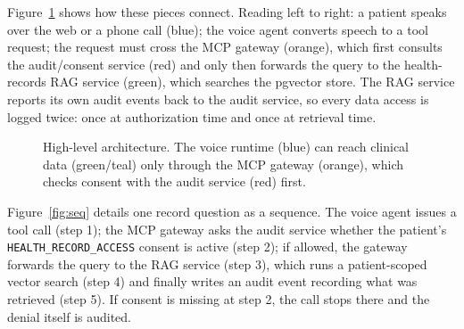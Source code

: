 \documentclass[conference]{IEEEtran}
\begin{document}
Figure~\ref{fig:arch} shows how these pieces connect.
Reading left to right: a patient speaks over the web or a phone call (blue); the voice agent converts speech to a tool request; the request must cross the MCP gateway (orange), which first consults the audit/consent service (red) and only then forwards the query to the health-records RAG service (green), which searches the pgvector store.
The RAG service reports its own audit events back to the audit service, so every data access is logged twice: once at authorization time and once at retrieval time.

\begin{figure}[!t]
\centering
{}
\caption{High-level architecture. The voice runtime (blue) can reach clinical data (green/teal) only through the MCP gateway (orange), which checks consent with the audit service (red) first.}
\label{fig:arch}
\end{figure}

Figure~\ref{fig:seq} details one record question as a sequence.
The voice agent issues a tool call (step 1); the MCP gateway asks the audit service whether the patient's \texttt{HEALTH\_RECORD\_ACCESS} consent is active (step 2); if allowed, the gateway forwards the query to the RAG service (step 3), which runs a patient-scoped vector search (step 4) and finally writes an audit event recording what was retrieved (step 5).
If consent is missing at step 2, the call stops there and the denial itself is audited.
\end{document}
